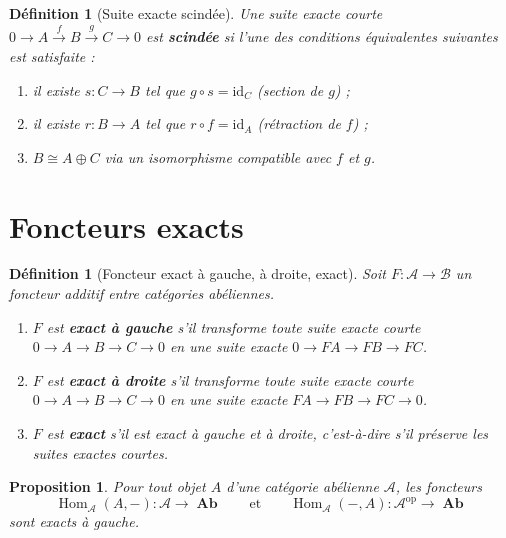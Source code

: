 \documentclass[a4paper,12pt]{book}
\DeclareMathOperator{\Hom}{Hom}
\DeclareMathOperator{\Ab}{\mathbf{Ab}}
\newcommand{\op}{\mathrm{op}}
\newcommand{\id}{\mathrm{id}}
\newtheorem{proposition}[theoreme]{Proposition}
\newtheorem{definition}[theoreme]{Définition}
\begin{document}
\begin{definition}[Suite exacte scindée]\label{def:split-ses}
Une suite exacte courte
$0 \to A \xrightarrow{f} B \xrightarrow{g} C \to 0$
est \textbf{scindée} si l'une des conditions équivalentes suivantes
est satisfaite :
\begin{enumerate}[label=(\roman*)]
\item il existe $s \colon C \to B$ tel que $g \circ s = \id_C$
  (section de $g$) ;
\item il existe $r \colon B \to A$ tel que $r \circ f = \id_A$
  (rétraction de $f$) ;
\item $B \cong A \oplus C$ via un isomorphisme compatible avec $f$ et $g$.
\end{enumerate}
\end{definition}


\section{Foncteurs exacts}\label{sec:exact-functors}

\begin{definition}[Foncteur exact à gauche, à droite, exact]\label{def:exact-functor}
Soit $F \colon \mathcal{A} \to \mathcal{B}$ un foncteur additif entre
catégories abéliennes.
\begin{enumerate}[label=(\roman*)]
\item $F$ est \textbf{exact à gauche}
  s'il transforme toute suite exacte courte
  $0 \to A \to B \to C \to 0$ en une suite exacte
  $0 \to FA \to FB \to FC$.

\item $F$ est \textbf{exact à droite}
  s'il transforme toute suite exacte courte
  $0 \to A \to B \to C \to 0$ en une suite exacte
  $FA \to FB \to FC \to 0$.

\item $F$ est \textbf{exact}
  s'il est exact à gauche et à droite, c'est-à-dire s'il préserve
  les suites exactes courtes.
\end{enumerate}
\end{definition}

\begin{proposition}\label{prop:hom-left-exact}
\index{Hom@$\Hom$!exactitude à gauche}
Pour tout objet $A$ d'une catégorie abélienne $\mathcal{A}$, les
foncteurs
\[
  \Hom_{\mathcal{A}}(A, -) \colon \mathcal{A} \to \Ab
  \qquad \text{et} \qquad
  \Hom_{\mathcal{A}}(-, A) \colon \mathcal{A}^{\op} \to \Ab
\]
sont exacts à gauche.
\end{proposition}
\end{document}
